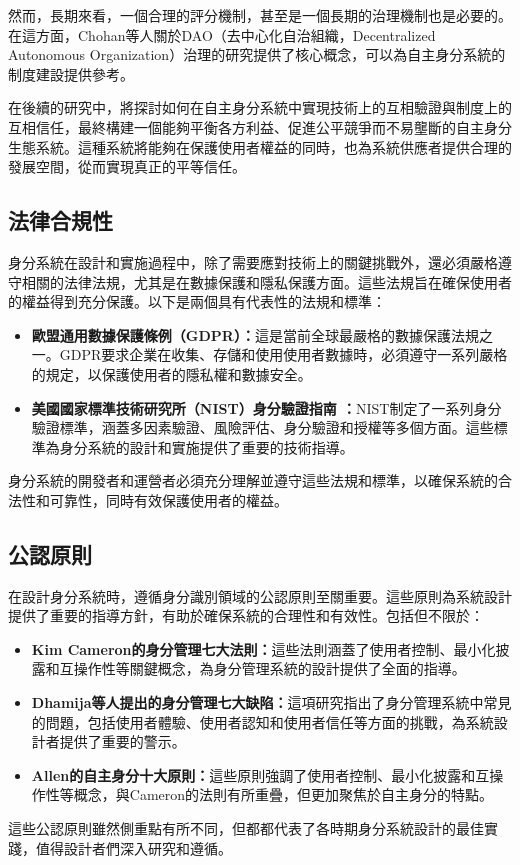 然而，長期來看，一個合理的評分機制，甚至是一個長期的治理機制也是必要的。在這方面，Chohan等人\cite{chohan2024decentralized}關於DAO（去中心化自治組織，Decentralized Autonomous Organization）治理的研究提供了核心概念，可以為自主身分系統的制度建設提供參考。

在後續的研究中，將探討如何在自主身分系統中實現技術上的互相驗證與制度上的互相信任，最終構建一個能夠平衡各方利益、促進公平競爭而不易壟斷的自主身分生態系統。這種系統將能夠在保護使用者權益的同時，也為系統供應者提供合理的發展空間，從而實現真正的平等信任。
\subsection{法律合規性}
身分系統在設計和實施過程中，除了需要應對技術上的關鍵挑戰外，還必須嚴格遵守相關的法律法規，尤其是在數據保護和隱私保護方面。這些法規旨在確保使用者的權益得到充分保護。以下是兩個具有代表性的法規和標準：
\begin{itemize}
  \item \textbf{歐盟通用數據保護條例（GDPR）\cite{GDPR2016}：}這是當前全球最嚴格的數據保護法規之一。GDPR要求企業在收集、存儲和使用使用者數據時，必須遵守一系列嚴格的規定，以保護使用者的隱私權和數據安全。
  \item \textbf{美國國家標準技術研究所（NIST）身分驗證指南 \cite{NIST800-63-3}：}NIST制定了一系列身分驗證標準，涵蓋多因素驗證、風險評估、身分驗證和授權等多個方面。這些標準為身分系統的設計和實施提供了重要的技術指導。
\end{itemize}
身分系統的開發者和運營者必須充分理解並遵守這些法規和標準，以確保系統的合法性和可靠性，同時有效保護使用者的權益。
\subsection{公認原則}
在設計身分系統時，遵循身分識別領域的公認原則至關重要。這些原則為系統設計提供了重要的指導方針，有助於確保系統的合理性和有效性。包括但不限於：
\begin{itemize}
  \item \textbf{Kim Cameron的身分管理七大法則\cite{cameron2005laws}：}這些法則涵蓋了使用者控制、最小化披露和互操作性等關鍵概念，為身分管理系統的設計提供了全面的指導。
  \item \textbf{Dhamija等人提出的身分管理七大缺陷\cite{dhamija2008sevenflaws}：}這項研究指出了身分管理系統中常見的問題，包括使用者體驗、使用者認知和使用者信任等方面的挑戰，為系統設計者提供了重要的警示。
  \item \textbf{Allen的自主身分十大原則\cite{allen2016selfsovereign}：}這些原則強調了使用者控制、最小化披露和互操作性等概念，與Cameron的法則有所重疊，但更加聚焦於自主身分的特點。
\end{itemize}
這些公認原則雖然側重點有所不同，但都都代表了各時期身分系統設計的最佳實踐，值得設計者們深入研究和遵循。
